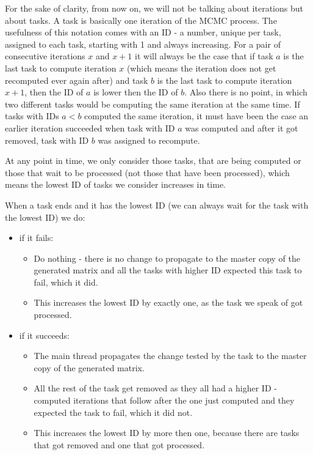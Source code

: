 For the sake of clarity, from now on, we will not be talking about iterations but about tasks. A task is basically one iteration of the MCMC process. The usefulness of this notation comes with an ID - a number, unique per task, assigned to each task, starting with 1 and always increasing. For a pair of consecutive iterations $x$ and $x+1$ it will always be the case that if task $a$ is the last task to compute iteration $x$ (which means the iteration does not get recomputed ever again after) and task $b$ is the last task to compute iteration $x+1$, then the ID of $a$ is lower then the ID of $b$. Also there is no point, in which two different tasks would be computing the same iteration at the same time. If tasks with IDs $a<b$ computed the same iteration, it must have been the case an earlier iteration succeeded when task with ID $a$ was computed and after it got removed, task with ID $b$ was assigned to recompute.

At any point in time, we only consider those tasks, that are being computed or those that wait to be processed (not those that have been processed), which means the lowest ID of tasks we consider increases in time.

When a task ends and it has the lowest ID (we can always wait for the task with the lowest ID) we do:
\begin{itemize}
\item if it fails:
\begin{itemize}
\item Do nothing - there is no change to propagate to the master copy of the generated matrix and all the tasks with higher ID expected this task to fail, which it did.
\item This increases the lowest ID by exactly one, as the task we speak of got processed.
\end{itemize}
\item if it succeeds: 
\begin{itemize}
\item The main thread propagates the change tested by the task to the master copy of the generated matrix.
\item All the rest of the task get removed as they all had a higher ID - computed iterations that follow after the one just computed and they expected the task to fail, which it did not.
\item This increases the lowest ID by more then one, because there are tasks that got removed and one that got processed.
\end{itemize}
\end{itemize}

